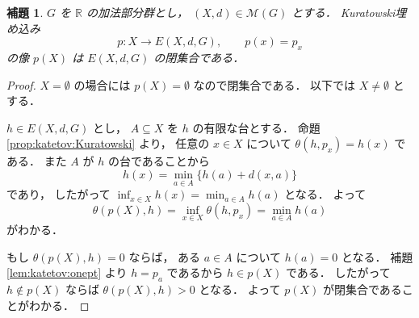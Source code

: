 \documentclass[leqno, 12pt]{jsarticle}
\newtheorem{lem}[thm]{補題}
\newcommand{\rr}{\mathbb{R}}
\newcommand{\SetPointDist}[3]{#1(#2,#3)}
\newcommand{\Met}[1]{\mathscr{M}(#1)}
\newcommand{\Espace}[3]{E(#1,#2,#3)}
\newcommand{\KatDist}{\theta}
\newcommand{\kura}[1]{p_{#1}}
\begin{document}
\begin{lem}\label{lem:func:katetov-image-closed}
$G$
を
$\rr$
の加法部分群とし，
$(X,d)\in\Met{G}$
とする．
Kuratowski埋め込み
\[
p\colon X\longrightarrow\Espace{X}{d}{G},
\qquad
p(x)=\kura{x}
\]
の像
$p(X)$
は
$\Espace{X}{d}{G}$
の閉集合である．
\end{lem}
\begin{proof}
$X=\emptyset$
の場合には
$p(X)=\emptyset$
なので閉集合である．
以下では
$X\neq\emptyset$
とする．

$h\in\Espace{X}{d}{G}$
とし，
$A\subseteq X$
を
$h$
の有限な台とする．
命題
\ref{prop:katetov:Kuratowski}
より，
任意の
$x\in X$
について
$\KatDist(h,\kura{x})=h(x)$
である．
また
$A$
が
$h$
の台であることから
\[
h(x)=\min_{a\in A}\{h(a)+d(x,a)\}
\]
であり，
したがって
$\inf_{x\in X}h(x)=\min_{a\in A}h(a)$
となる．
よって
\[
\SetPointDist{\KatDist}{p(X)}{h}
=
\inf_{x\in X}\KatDist(h,\kura{x})
=
\min_{a\in A}h(a)
\]
がわかる．

もし
$\SetPointDist{\KatDist}{p(X)}{h}=0$
ならば，
ある
$a\in A$
について
$h(a)=0$
となる．
補題
\ref{lem:katetov:onept}
より
$h=\kura{a}$
であるから
$h\in p(X)$
である．
したがって
$h\notin p(X)$
ならば
$\SetPointDist{\KatDist}{p(X)}{h}>0$
となる．
よって
$p(X)$
が閉集合であることがわかる．
\end{proof}
\end{document}
